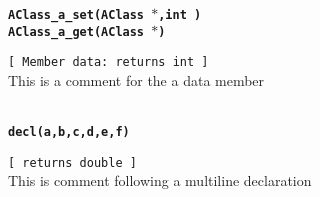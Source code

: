 {\tt \bf AClass\_a\_set(AClass $*$,int )\\
AClass\_a\_get(AClass $*$) }
\\
\makebox[0.5in]{}\begin{minipage}[t]{6in}
{\tt [ Member data: returns int  ]  }\\
   This is a comment for the a data member   
\\

\end{minipage}\\

{\tt \bf decl(a,b,c,d,e,f) }
\\
\makebox[0.5in]{}\begin{minipage}[t]{6in}
{\tt [ returns double  ]  }\\
   This is comment following a multiline declaration   
\\

\end{minipage}\\



